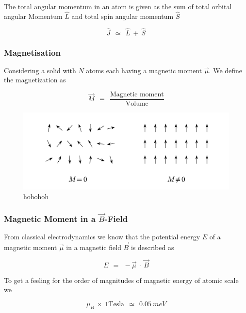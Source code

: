 \documentclass[10pt]{report}
\numberwithin{equation}{chapter}
\begin{document}
The total angular momentum in an atom is given as the sum of total orbital angular Momentum $\hat{L}$  and total spin angular momentum $\hat{S}$

\begin{equation}
  \hat{J} ~~≃~~ \hat{L} ~+~ \hat{S}
\end{equation}

\subsubsection{Magnetisation}

Considering a solid with $N$ atoms each having a magnetic moment $\vec{\mu}$. We define the magnetization as 

\begin{equation}
  \vec{M} ~~\equiv~~ \frac{\text{Magnetic moment}}{\text{Volume}}
\end{equation}

\begin{figure}
  \centering
  \includegraphics[width=0.8\linewidth]{../img/mag_in_solid.pdf}
  \caption{hohohoh}
\end{figure}

\subsubsection{Magnetic Moment in a $\vec{B}$-Field}


From classical electrodynamics we know that the potential energy $E$ of a magnetic moment $\vec{\mu}$ in a magnetic field $\vec{B}$ is described as

\begin{equation}
  E ~~=~~ - \vec{\mu} ~\cdot~ \vec{B}
\end{equation}

To get a feeling for the order of magnitudes of magnetic energy of atomic scale we 

\begin{equation*}
  \mu_B ~\times~ 1 \text{Tesla} ~~\simeq~~ \SI{0.05}{meV}
\end{equation*}
\end{document}
